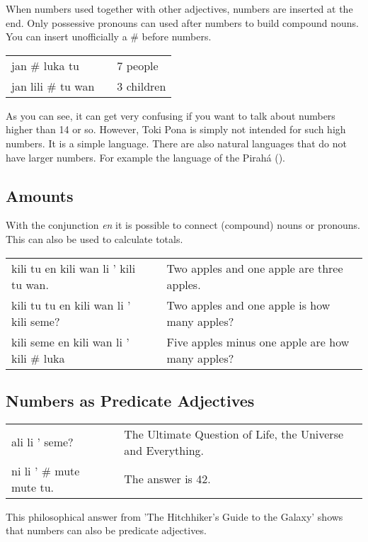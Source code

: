 When numbers used together with other adjectives, numbers are inserted at the end.
Only possessive pronouns can used after numbers to build compound nouns.
You can insert unofficially a \# before numbers.

\begin{supertabular}{p{5,5cm}|ll}
    jan \# luka tu     &  & 7 people   \\
    jan lili \# tu wan &  & 3 children \\
\end{supertabular}

As you can see, it can get very confusing if you want to talk about numbers higher than 14 or so.
However, Toki Pona is simply not intended for such high numbers.
It is a simple language.
There are also natural languages that do not have larger numbers.
For example the language of the Pirah\'{a} (\cite{www:piraha:01}).

\subsection*{Amounts}
With the conjunction \textit{en} it is possible to connect (compound) nouns or pronouns.
This can also be used to calculate totals.

\begin{supertabular}{p{5,5cm}|ll}
    kili tu en kili wan li ' kili tu wan.   &  & Two apples and one apple are three apples.       \\
    kili tu tu en kili wan li ' kili seme?  &  & Two apples and one apple is how many apples?     \\
    kili seme en kili wan li ' kili \# luka &  & Five apples minus one apple are how many apples? \\
\end{supertabular}

\subsection*{Numbers as Predicate Adjectives}
\begin{supertabular}{p{5,5cm}|ll}
    ali li ' seme?           &  & The Ultimate Question of Life, the Universe and Everything. \\
    ni li ' \# mute mute tu. &  & The answer is 42.                                           \\
\end{supertabular}

This philosophical answer from 'The Hitchhiker's Guide to the Galaxy' shows that numbers can also be predicate adjectives.

